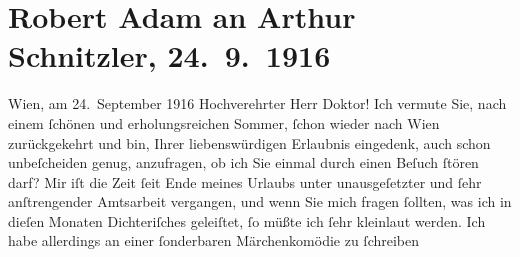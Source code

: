 

         
         \renewcommand{\erwaehntePersonen}{Personen: Charles de Coster, Alexandre père Dumas,  G. Lenotre, Ricarda Huch, Viktor Franz Patzner}
         \renewcommand{\erwaehnteOrte}{Orte: Wien}
         \renewcommand{\erwaehnteWerke}{Werke: Bleus, Blancs et Rouges, Der große Krieg in Deutschland, Jean Christophe, Le mariage de Monsieur de Bréchard, Meine Memoiren, Märchenkomödie, Tyll Ulenspiegel und Lamm Goedzak}
               \section[Robert Adam an Arthur Schnitzler, 24. 9. 1916]{ Robert Adam an Arthur Schnitzler, 24. 9. 1916}\nopagebreak{}\rehead{ }\begin{ledgroupsized}[t]{13cm}\normalsize\beginnumbering \toendnotes[C]{\smallbreak\pagebreak[2]} 
\toendnotes[C]{\smallbreak}\pstart
           \raggedleft{}{\pb}Wien, am 24. September 1916\pend
           \pstart{}Hochverehrter Herr Doktor!\pend\pstart
           Ich vermute Sie, nach einem ſchönen und erholungsreichen Sommer, ſchon wieder
                    nach Wien zurückgekehrt und bin, Ihrer
                    liebenswürdigen Erlaubnis eingedenk, auch schon unbeſcheiden genug, anzufragen,
                    ob ich Sie einmal durch einen Beſuch ſtören darf?\pend
           \pstart
           Mir iſt die Zeit ſeit Ende meines Urlaubs unter unausgeſetzter und ſehr
                    anſtrengender Amtsarbeit vergangen, und wenn Sie mich fragen ſollten, was ich in
                    dieſen Monaten Dichteriſches geleiſtet, ſo müßte ich ſehr kleinlaut werden. Ich
                    habe allerdings an einer {\pb}ſonderbaren Märchenkomödie zu ſchreiben

\end{ledgroupsized}
